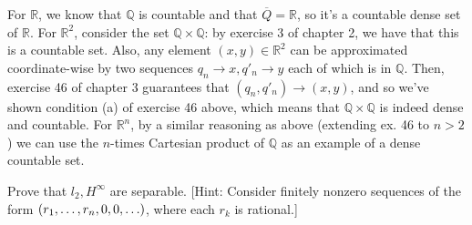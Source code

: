 \begin{solution}
    
    For $\mathbb{R}$, we know that $\mathbb{Q}$ is countable and that $\overline{Q} = \mathbb{R}$, so it's a countable dense set of $\mathbb{R}$.
    For $\mathbb{R}^2$, consider the set $\mathbb{Q} \times \mathbb{Q}$: by exercise 3 of chapter 2, we have that this is a countable set.
    Also, any element $(x, y) \in \mathbb{R}^2$ can be approximated coordinate-wise by two sequences $q_n \rightarrow x, q'_n \rightarrow y$ each of which is in $\mathbb{Q}$.
    Then, exercise 46 of chapter 3 guarantees that $(q_n, q'_n) \rightarrow (x, y)$, and so we've shown condition (a) of exercise 46 above, which means that $\mathbb{Q} \times \mathbb{Q}$ is indeed dense and countable.
    For $\mathbb{R}^n$, by a similar reasoning as above (extending ex. 46 to $n > 2$) we can use the $n$-times Cartesian product of $\mathbb{Q}$ as an example of a dense countable set.
\end{solution}

\begin{exercise}{49}
    Prove that $l_2, H^{\infty}$ are separable. 
    [Hint: Consider finitely nonzero sequences of the form $\\ (r_1, \ldots, r_n, 0, 0, \ldots)$, where each $r_k$ is rational.]
\end{exercise}

